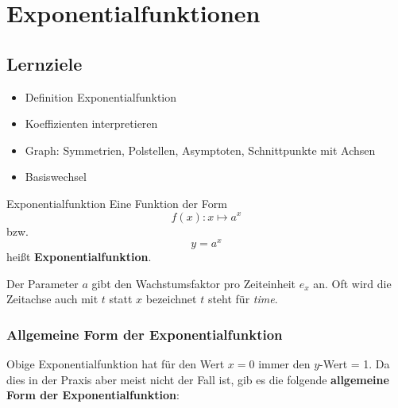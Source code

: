 
\section{Exponentialfunktionen}
\subsection*{Lernziele}

\begin{itemize}
\item Definition Exponentialfunktion
\item Koeffizienten interpretieren
\item Graph: Symmetrien, Polstellen, Asymptoten, Schnittpunkte mit Achsen
\item Basiswechsel
\end{itemize}




%



\begin{definition}{Exponentialfunktion}{}
  Eine Funktion der Form $$f(x): x \mapsto a^x$$
  bzw. $$y = a^x$$
  heißt \textbf{Exponentialfunktion}.
\end{definition}

Der Parameter $a$ gibt den Wachstumsfaktor pro Zeiteinheit $e_x$ an.
 Oft wird die Zeitachse auch mit $t$ statt $x$ bezeichnet $t$ steht für \textit{time}.
\newpage

\subsubsection{Allgemeine Form der Exponentialfunktion}

Obige Exponentialfunktion hat für den Wert $x=0$ immer den $y$-Wert = 1. Da dies in der Praxis aber meist nicht der Fall ist, gib es die folgende \textbf{allgemeine Form der Exponentialfunktion}:


